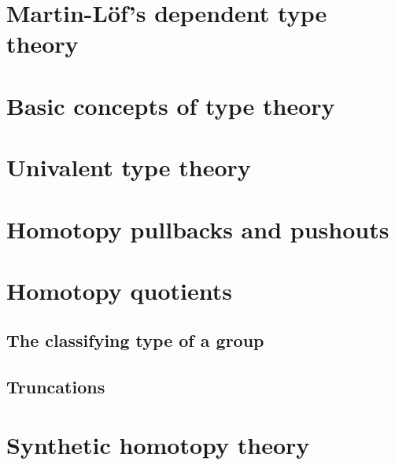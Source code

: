 \documentclass[11pt]{memoir} %
\begin{document}
\mainmatter

\renewcommand{\thechapter}{\Roman{chapter}}

\chapter{Martin-L\"of's dependent type theory}






\chapter{Basic concepts of type theory}






\chapter{Univalent type theory}




\chapter{Homotopy pullbacks and pushouts}






\chapter{Homotopy quotients}



\section{The classifying type of a group}

\section{Truncations}

\chapter{Synthetic homotopy theory}






%

\backmatter

\printbibliography

\printindex
\end{document}
